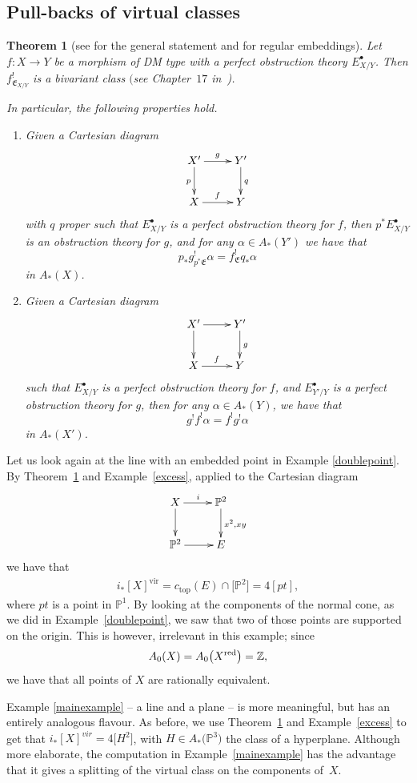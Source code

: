 \documentclass[pdftex]{sigma}
\numberwithin{equation}{section}
\newtheorem{Theorem}{Theorem}[section]
\newcommand{\PP}{\mathbb P}
\begin{document}
\subsection{Pull-backs of virtual classes}
\begin{Theorem}[see \cite{vir-pull} for the general statement and {\cite[Chapter 6]{Fulton}} for regular embeddings]\label{vir pull-back} Let $f\colon X\to Y$ be a morphism of DM type with a perfect obstruction theory $E^\bullet_{X/Y}$. Then $f^!_{\mathfrak E_{X/Y}}$ is a bivariant class $($see Chapter~$17$ in~{\rm \cite{Fulton})}.

In particular, the following properties hold.
\begin{enumerate}\itemsep=0pt
\item[$(a)$] Given a Cartesian diagram
\[
\xymatrix{X'\ar[r]^g\ar[d]_p&Y'\ar[d]^q\\
X\ar[r]^f&Y}\]
with $q$ proper such that $E^\bullet_{X/Y}$ is a perfect obstruction theory for $f$, then $p^*E^\bullet_{X/Y}$ is an obstruction theory for $g$, and for any $\alpha\in A_*(Y')$ we have that
\[p_*g^!_{p^*\mathfrak E}\alpha=f^!_{\mathfrak E}q_*\alpha
\]
in $A_*(X)$.

\item[$(b)$] Given a Cartesian diagram
\[
\xymatrix{X'\ar[r]\ar[d]&Y'\ar[d]^g\\
X\ar[r]^f&Y}\]
such that $E^\bullet_{X/Y}$ is a perfect obstruction theory for $f$, and $E^\bullet_{Y'/Y}$ is a perfect obstruction theory for $g$, then for any $\alpha\in A_*(Y)$, we have that
\[g^!f^!\alpha=f^!g^!\alpha
\]
in $A_*(X')$.
\end{enumerate}
\end{Theorem}
\begin{Remark}Let us look again at the line with an embedded point in Example \ref{doublepoint}.
By Theo\-rem~\ref{vir pull-back} and Example~\ref{excess}, applied to the Cartesian diagram
\[\xymatrix{X\ar[r]^i\ar[d]&\PP^2\ar[d]^{x^2,xy}\\
\PP^2\ar[r]& E
}
\]
we have that
\begin{gather*}i_*[X]^\text{vir}= c_\text{top} (E)\cap \big[\mathbb P^2\big] =4[pt],
\end{gather*}
where $pt$ is a point in $\PP^1$. By looking at the components of the normal cone, as we did in Example~\ref{doublepoint}, we saw that two of those points are supported on the origin. This is however, irrelevant in this example; since
\[A_0(X)=A_0\big(X^{{\rm red}}\big)=\mathbb Z,
\]
we have that all points of $X$ are rationally equivalent.

Example \ref{mainexample} -- a line and a plane -- is more meaningful, but has an entirely analogous flavour. As before, we use Theorem~\ref{vir pull-back} and Example~\ref{excess} to get that $i_*[X]^{vir}=4\big[H^2\big]$, with $H\in A_*\big(\PP^3\big)$ the class of a hyperplane. Although more elaborate, the computation in Example~\ref{mainexample} has the advantage that it gives a splitting of the virtual class on the components of~$X$.
\end{Remark}
\end{document}
